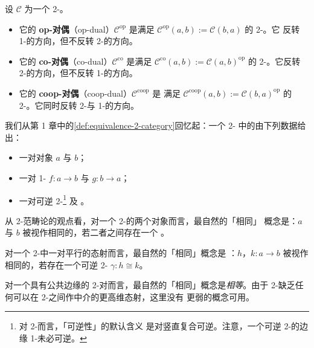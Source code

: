 \begin{definition}[op-对偶与 co-对偶]\label{def:op-co-duals}
设 $\mathcal{C}$ 为一个 2-\trCategory。
\begin{itemize}
\item 它的 \textbf{op-对偶}（op-dual）$\mathcal{C}^{\mathrm{op}}$ 是满足
  $\mathcal{C}^{\mathrm{op}}(a,b):=\mathcal{C}(b,a)$ 的 2-\trCategory。它
  反转 1-\trCell{}的方向，但不反转 2-\trCell{}的方向。
\item 它的 \textbf{co-对偶}（co-dual）$\mathcal{C}^{\mathrm{co}}$ 是满足
  $\mathcal{C}^{\mathrm{co}}(a,b):=\mathcal{C}(a,b)^{\mathrm{op}}$ 的
  2-\trCategory。它反转 2-\trCell{}的方向，但不反转 1-\trCell{}的方向。
\item 它的 \textbf{coop-对偶}（coop-dual）$\mathcal{C}^{\mathrm{coop}}$ 是
  满足 $\mathcal{C}^{\mathrm{coop}}(a,b):=\mathcal{C}(b,a)^{\mathrm{op}}$
  的 2-\trCategory。它同时反转 2-\trCell{}与 1-\trCell{}的方向。
\end{itemize}
\end{definition}

我们从第 1 章中的\cref{def:equivalence-2-category}回忆起：一个 2-\trCategory{}%
中的\trEquivalence{}由下列数据给出：
\begin{itemize}
\item 一对对象 $a$ 与 $b$；
\item 一对 1-\trCell{} $f\colon a\to b$ 与 $g\colon b\to a$；
\item 一对可逆 2-\trCell\footnote{对 2-\trCell{}而言，「可逆性」的默认含义
  是对竖直复合可逆。注意，一个可逆 2-\trCell{}的边缘 1-\trCell{}未必可逆。}
  及
  。
\end{itemize}

\begin{digression}\label{dig:notions-of-sameness}
从 2-范畴论的观点看，对一个 2-\trCategory{}的两个对象而言，最自然的「相同」
概念是\emph{\trEquivalence}：$a$ 与 $b$ 被视作相同的，若二者之间存在一个%
\trEquivalence。

对一个 2-\trCategory{}中一对平行的态射而言，最自然的「相同」概念是%
\emph{\trIsomorphism}：$h$，$k\colon a\to b$ 被视作相同的，若存在一个可逆
2-\trCell{} $\gamma\colon h\cong k$。

对一个具有公共边缘的 2-\trCell{}对而言，最自然的「相同」概念是\emph{相等}。由于
2-\trCategory{}缺乏任何可以在 2-\trCell{}之间作中介的更高维态射，这里没有
更弱的概念可用。
\end{digression}

